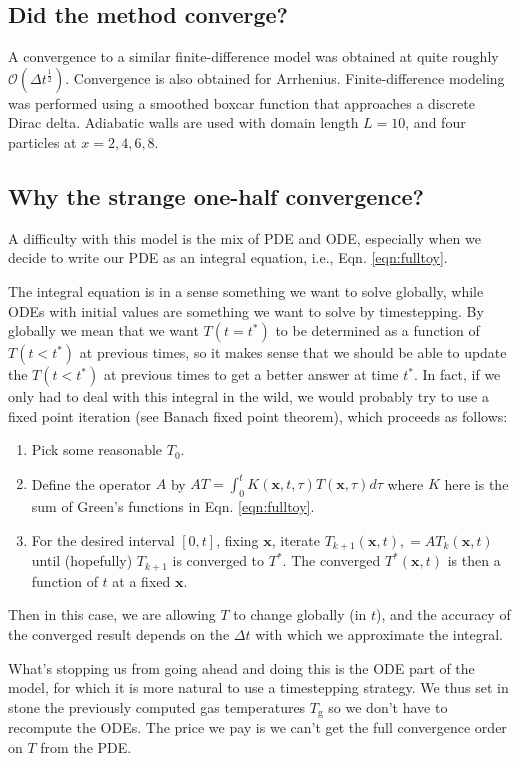 \documentclass{article}
\begin{document}
\subsection{Did the method converge?}
A convergence to a similar finite-difference model was obtained at quite roughly $\mathcal{O}(\Delta t^\frac{1}{2})$. Convergence is also obtained for Arrhenius. Finite-difference modeling was performed using a smoothed boxcar function that approaches a discrete Dirac delta. Adiabatic walls are used with domain length $L = 10$, and four particles at $x = 2, 4, 6, 8$.

\subsection{Why the strange one-half convergence?}
A difficulty with this model is the mix of PDE and ODE, especially when we decide to write our PDE as an integral equation, i.e., Eqn. \ref{eqn:fulltoy}.

The integral equation is in a sense something we want to solve globally, while ODEs with initial values are something we want to solve by timestepping. By globally we mean that we want $T(t = t^*)$ to be determined as a function of $T(t < t^*)$ at previous times, so it makes sense that we should be able to update the $T( t < t^*)$ at previous times to get a better answer at time $t^*$. In fact, if we only had to deal with this integral in the wild, we would probably try to use a fixed point iteration (see Banach fixed point theorem), which proceeds as follows:

\begin{enumerate}
    \item Pick some reasonable $T_0$.
    \item Define the operator $A$ by $AT = \int_0^t K(\mathbf{x}, t, \tau) T(\mathbf{x}, \tau) d\tau$ where $K$ here is the sum of Green's functions in Eqn. \ref{eqn:fulltoy}.
    \item For the desired interval $[0,t]$, fixing $\mathbf{x}$, iterate $T_{k+1}(\mathbf{x}, t), = AT_k(\mathbf{x}, t)$ until (hopefully) $T_{k+1}$ is converged to $T^*$. The converged $T^*(\mathbf{x}, t)$ is then a function of $t$ at a fixed $\mathbf{x}$.
\end{enumerate}

Then in this case, we are allowing $T$ to change globally (in $t$), and the accuracy of the converged result depends on the $\Delta t$ with which we approximate the integral.

What's stopping us from going ahead and doing this is the ODE part of the model, for which it is more natural to use a timestepping strategy. We thus set in stone the previously computed gas temperatures $T_\mathrm{g}$ so we don't have to recompute the ODEs. The price we pay is we can't get the full convergence order on $T$ from the PDE.
\end{document}
